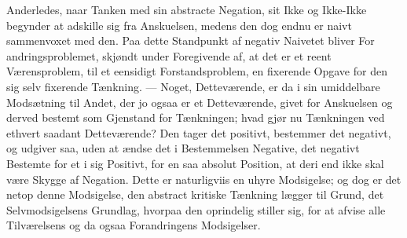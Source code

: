 \documentclass[11pt]{book}
\newcommand{\opage}[1]{\marginnote{\footnotesize\textit{[#1]}}}
\begin{document}
Anderledes, naar Tanken med sin abstracte Negation, sit Ikke og
Ikke-Ikke begynder at adskille sig fra Anskuelsen, medens den dog
endnu er naivt sammenvoxet med den. Paa dette Standpunkt af negativ
Naivetet bliver For\-%
\opage{16} \setcounter{footnote}{0}%
andringsproblemet, skjøndt under Foregivende af, at det er et reent
Værensproblem, til et eensidigt Forstandsproblem, en fixerende Opgave
for den sig selv fixerende Tænkning. --- Noget, Detteværende, er da i
sin umiddelbare Modsætning til Andet, der jo ogsaa er et
Detteværende, givet for Anskuelsen og derved bestemt som Gjenstand
for Tænkningen; hvad gjør nu Tænkningen ved ethvert saadant
Detteværende? Den tager det positivt, bestemmer det negativt, og
udgiver saa, uden at ændse det i Bestemmelsen Negative, det negativt
Bestemte for et i sig Positivt, for en saa absolut Position, at deri
end ikke skal være Skygge af Negation. Dette er naturligviis en uhyre
Modsigelse; og dog er det netop denne Modsigelse, den abstract
kritiske Tænkning lægger til Grund, det Selvmodsigelsens Grundlag,
hvorpaa den oprindelig stiller sig, for at afvise alle Tilværelsens
og da ogsaa Forandringens Modsigelser.
\end{document}
